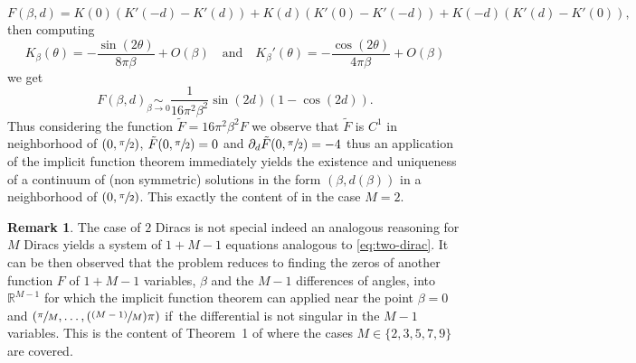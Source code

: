 \documentclass[JEP,XML,SOM,Unicode,NoFloatCountersInSection,published]{cedram}
\newcommand{\Psfrac}[2]{(\sfrac{#1}{#2})}
\theoremstyle{plain}
\theoremstyle{definition}
\newtheorem{remark}[theorem]{Remark}
\begin{document}
\[
F(\beta,d)=K(0)(K'(-d)-K'(d)) + K(d)(K'(0)-K'(-d)) + K(-d)(K'(d)-K'(0)),
\]
then computing\vspace*{-3pt}
\[
K_{\beta}(\theta)= -\frac{\sin(2\theta)}{8\pi\beta}+O(\beta) \quad\text{and}\quad K_{\beta}'(\theta)= -\frac{\cos(2\theta)}{4\pi\beta}+O(\beta)
\]
we get\vspace*{-3pt}
\[
F(\beta,d)\underset{\beta \to 0}{\sim} \frac{1}{16\pi^2 \beta^2}\sin(2d)(1-\cos(2d)).
\]
Thus considering the function $\tilde{F}=16\pi^2 \beta^2 F$ we observe that $\tilde{F}$ is $C^1$ in neighborhood of $(0,\sfrac{\pi}{2})$, $\tilde{F}(0,\sfrac{\pi}{2})=0$ and $\partial_d\tilde{F}(0,\sfrac{\pi}{2})=-4$ thus an application of the implicit function theorem immediately yields the existence and uniqueness of a continuum of (non symmetric) solutions in the form $(\beta,d(\beta))$ in a neighborhood of $(0,\sfrac{\pi}{2})$. This exactly the content of \cite[Th.\,1]{CKW22} in the case $M=2$.

\begin{remark}\label{Rem: contains ckw}
The case of $2$ Diracs is not special indeed an analogous reasoning for $M$ Diracs yields a system of $1+M-1$ equations analogous to \eqref{eq:two-dirac}. It can be then observed that the problem reduces to finding the zeros of another function $F$ of \hbox{$1+M-1$} variables, $\beta$ and the $M-1$ differences of angles, into $\mathbb{R}^{M-1}$ for which the implicit function theorem can applied near the point $\beta=0$ and $(\sfrac{\pi}{M},\dots,\Psfrac{(M-1)}{M}\pi)$ if~the differential is not singular in the $M-1$ variables. This is the content of Theorem~1 of \cite{CKW22} where the cases $M\in \{2,3,5,7,9\}$ are covered.
\end{remark}
\end{document}

